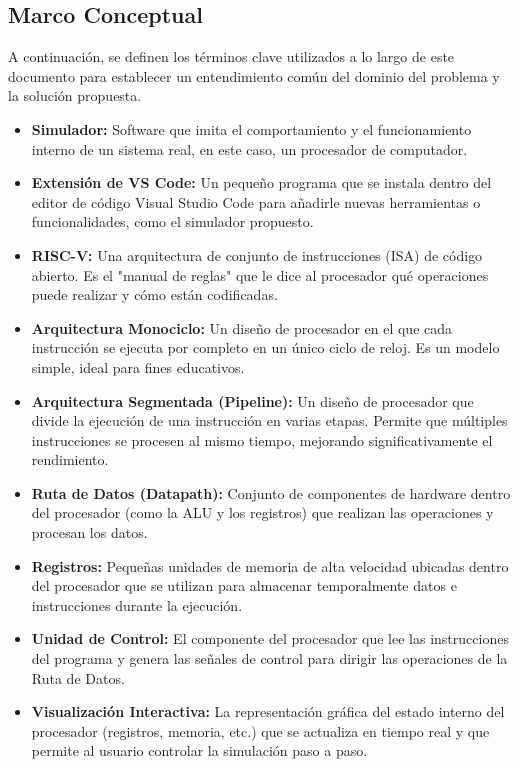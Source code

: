 \documentclass[12pt, letterpaper]{article}
\begin{document}
\subsection{Marco Conceptual}
A continuación, se definen los términos clave utilizados a lo largo de este documento para establecer un entendimiento común del dominio del problema y la solución propuesta.
\begin{itemize}
    \item \textbf{Simulador:} Software que imita el comportamiento y el funcionamiento interno de un sistema real, en este caso, un procesador de computador.
    \item \textbf{Extensión de VS Code:} Un pequeño programa que se instala dentro del editor de código Visual Studio Code para añadirle nuevas herramientas o funcionalidades, como el simulador propuesto.
    \item \textbf{RISC-V:} Una arquitectura de conjunto de instrucciones (ISA) de código abierto. Es el "manual de reglas" que le dice al procesador qué operaciones puede realizar y cómo están codificadas.
    \item \textbf{Arquitectura Monociclo:} Un diseño de procesador en el que cada instrucción se ejecuta por completo en un único ciclo de reloj. Es un modelo simple, ideal para fines educativos.
    \item \textbf{Arquitectura Segmentada (Pipeline):} Un diseño de procesador que divide la ejecución de una instrucción en varias etapas. Permite que múltiples instrucciones se procesen al mismo tiempo, mejorando significativamente el rendimiento.
    \item \textbf{Ruta de Datos (Datapath):} Conjunto de componentes de hardware dentro del procesador (como la ALU y los registros) que realizan las operaciones y procesan los datos.
    \item \textbf{Registros:} Pequeñas unidades de memoria de alta velocidad ubicadas dentro del procesador que se utilizan para almacenar temporalmente datos e instrucciones durante la ejecución.
    \item \textbf{Unidad de Control:} El componente del procesador que lee las instrucciones del programa y genera las señales de control para dirigir las operaciones de la Ruta de Datos.
    \item \textbf{Visualización Interactiva:} La representación gráfica del estado interno del procesador (registros, memoria, etc.) que se actualiza en tiempo real y que permite al usuario controlar la simulación paso a paso.
\end{itemize}
\end{document}
